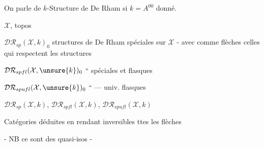 On parle de $k$-Structure de De Rham si $k=A^{00}$  donné.

$\mathcal X$, topos

$\mathcal{DR}_{sp}(\mathcal X,k)_0$ structures de De Rham spéciales sur $\mathcal X$ - avec comme flèches celles qui respectent  les structures 

$\mathcal{DR}_{spfl}(\mathcal X,\unsure{k})_0$ \quad `` \quad spéciales et flasques

$\mathcal{DR}_{spufl}(\mathcal X,\unsure{k})_0$ \quad `` \quad --- univ. flasques

$\mathcal{DR}_{sp}(\mathcal X,k)$, $\mathcal{DR}_{spfl}(\mathcal X,k)$, $\mathcal{DR}_{spufl}(\mathcal X,k)$

Catégories  déduites en rendant inversibles ttes les flèches

- NB ce sont des quasi-isos -


